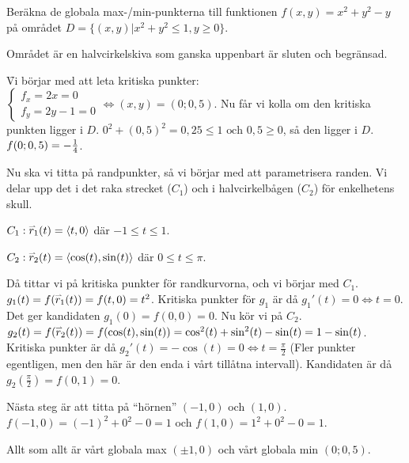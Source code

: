 \documentclass[a4paper]{article}
\begin{document}
\begin{ex}
    Beräkna de globala max-/min-punkterna till funktionen \(
        f(x,y) = x^2+y^2-y
    \) på området \(
        D = \{(x,y) | x^2+y^2 \leq 1, y \geq 0\}
    \).

    Området är en halvcirkelskiva som ganska uppenbart är sluten och begränsad.
    
    \f 

    Vi börjar med att leta kritiska punkter: \(
        \left\{\begin{matrix}
            f_x = 2x = 0\\ 
            f_y = 2y-1 = 0
        \end{matrix}\right. \iff (x,y) = (0; 0,5)
    \). Nu får vi kolla om den kritiska punkten ligger i \(
        D
    \). \(
        0^2+{(0,5)}^2 = 0,25 \leq 1 \text{ och } 0,5 \geq 0
    \), så den ligger i \(
        D
    \). \(
        f(0; 0,5) = -\frac{1}{4}
    \). 

    Nu ska vi titta på randpunkter, så vi börjar med att parametrisera randen.
    Vi delar upp det i det raka strecket (\(
        C_1
    \)) och i halvcirkelbågen (\(
        C_2
    \)) för enkelhetens 
    skull. 

    \(
        C_1: \accentset{\rightharpoonup}{r}_1 (t) = \left\langle t, 0\right\rangle 
    \) där \(
        -1 \leq t \leq 1
    \).

    \(
        C_2: \accentset{\rightharpoonup}{r}_2 (t) = \left\langle \cos(t), \sin(t) \right\rangle
    \) där \(
        0 \leq t \leq \pi
    \).

    Då tittar vi på kritiska punkter för randkurvorna, och vi börjar med \(
        C_1
    \). \(
        g_1(t) = f(\accentset{\rightharpoonup}{r}_1(t)) = f(t, 0) = t^2
    \). Kritiska punkter för \(
        g_1
    \) är då \(
        g_1'(t) = 0 \iff t = 0
    \). Det ger kandidaten \(
        g_1(0) = f(0,0) = 0
    \). Nu kör vi på \(
        C_2
    \). \(
        g_2(t) = f(\accentset{\rightharpoonup}{r}_2(t)) = f(\cos(t), \sin(t)) = 
        \cos^2(t) + \sin^2(t) - \sin(t) = 1 - \sin(t)
    \). Kritiska punkter är då \(
        g_2'(t) = -\cos(t) = 0 \iff t = \frac{\pi}{2}
    \) (Fler punkter egentligen, men den här är den enda i vårt tillåtna 
    intervall). Kandidaten är då \(
        g_2(\frac{\pi}{2}) = f(0,1) = 0
    \).

    Nästa steg är att titta på \enquote{hörnen} \(
        (-1, 0) 
    \) och \(
        (1,0)
    \). \(
        f(-1, 0) = {(-1)}^2 + 0^2 - 0 = 1
    \) och \(
        f(1,0) = 1^2+0^2-0 = 1
    \). 

    Allt som allt är vårt globala max \(
        (\pm 1, 0)
    \) och vårt globala min \(
        (0; 0,5)
    \).
\end{ex}
\end{document}
